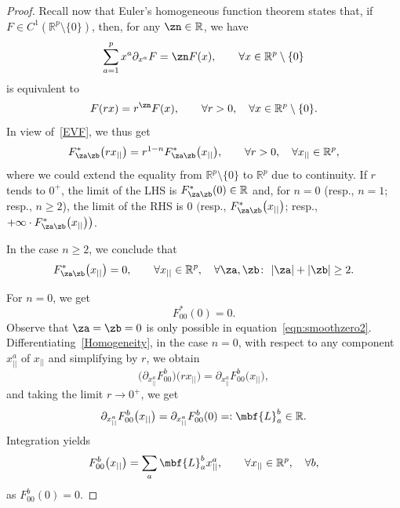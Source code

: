 \documentclass[pdftex]{sigma}%
\newcommand{\R}{{\mathbb R}}
\newcommand{\0}{\otimes}
\numberwithin{equation}{section}
\begin{document}
\begin{proof}
Recall now that Euler's homogeneous function theorem states that, if $F\in C^1(\R^p\setminus\{0\})$, then, for any $\zn\in\R$, we have
\[
\sum_{a=1}^{p}x^a\partial_{x^a}F=\zn F(x),\qquad\forall x\in\R^p\setminus\{0\}
\]
is equivalent to
\[
F(r x)=r^\zn F(x),\qquad\forall r>0,\quad\forall x\in\R^p\setminus\{0\}.
\]
In view of~\eqref{EVF}, we thus get
\begin{gather}\label{Homogeneity}
F_{\za\zb}^\ast\big(rx_{||}\big)=r^{1-n}F_{\za\zb}^\ast\big(x_{||}\big),\qquad
\forall r>0,\quad \forall x_{||}\in\R^p,
\end{gather}
 where we could extend the equality from $\R^p\setminus\{0\}$ to $\R^p$ due to continuity. If $r$ tends to $0^+$, the limit of the {\small LHS} is $F_{\za\zb}^\ast(0)\in\R$ and, for $n=0$ (resp., $n=1$; resp., $n\ge 2$), the limit of the {\small RHS} is $0$ $\big($resp., $F_{\za\zb}^\ast\big(x_{||}\big)$; resp., $+\infty\cdot F_{\za\zb}^\ast\big(x_{||}\big)\big)$.

In the case $n\ge 2$, we conclude that
\begin{gather}\label{LinForm1}
F_{\za\zb}^*\big(x_{||}\big)=0,\qquad
\forall x_{||}\in\R^p,\quad \forall \za,\zb\colon\ |\za|+|\zb|\ge 2.
\end{gather}

For $n=0$, we get
\[
F^*_{00}(0)=0.
\]
Observe that $\za=\zb=0$ is only possible in equation~\eqref{eqn:smoothzero2}. Differentiating~\eqref{Homogeneity}, in the case $n=0$, with respect to any component $x_{||}^a$ of $x_{||}$ and simplifying by $r$, we obtain
\[
\big(\partial_{x^a_{||}}F_{00}^b\big)\big(rx_{||}\big)=\partial_{x_{||}^a}F^b_{00}\big(x_{||}\big),
\]
and taking the limit $r\to 0^+$, we get
\[
\partial_{x_{||}^a}F^b_{00}\big(x_{||}\big)=\partial_{x_{||}^a}F^b_{00}(0)=:\mbf{L}^b_a\in\R.
\]
Integration yields
\begin{gather}\label{LinForm2}
F^b_{00}\big(x_{||}\big)=\sum_a \mbf{L}^b_a x_{||}^a,\qquad
\forall x_{||}\in\R^p,\quad \forall b,
\end{gather}
as $F_{00}^b(0)=0$.


\end{proof}
\end{document}
